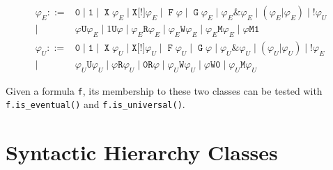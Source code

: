 \documentclass[a4paper,twoside,10pt,DIV=12]{scrreprt}
\DeclareMathOperator{\F}{\texttt{F}}
\DeclareMathOperator{\G}{\texttt{G}}
\newcommand{\U}{\mathbin{\texttt{U}}}
\newcommand{\R}{\mathbin{\texttt{R}}}
\DeclareMathOperator{\X}{\texttt{X}}
\newcommand{\StrongX}{\texttt{X[!]}}
\newcommand{\M}{\mathbin{\texttt{M}}}
\newcommand{\W}{\mathbin{\texttt{W}}}
\DeclareMathOperator{\NOT}{\texttt{!}}
\newcommand{\OR}{\mathbin{\texttt{|}}}
\newcommand{\AND}{\mathbin{\texttt{\&}}}
\newcommand{\0}{\texttt{0}}
\newcommand{\1}{\texttt{1}}
\begin{document}
\begin{align*}
  \varphi_E ::={}& \0
           \mid \1
           \mid \X \varphi_E
           \mid \StrongX \varphi_E
           \mid \F \varphi
           \mid \G \varphi_E
           \mid \varphi_E\AND \varphi_E
           \mid (\varphi_E\OR \varphi_E)
           \mid \NOT\varphi_U\\
           \mid{}&\varphi  \U \varphi_E
           \mid 1        \U \varphi
           \mid \varphi_E\R \varphi_E
           \mid \varphi_E\W \varphi_E
           \mid \varphi_E\M \varphi_E
           \mid \varphi  \M \1\\
  \varphi_U ::={}& \0
           \mid \1
           \mid \X \varphi_U
           \mid \StrongX \varphi_U
           \mid \F \varphi_U
           \mid \G \varphi
           \mid \varphi_U\AND \varphi_U
           \mid (\varphi_U\OR \varphi_U)
           \mid \NOT\varphi_E\\
           \mid{}&\varphi_U\U \varphi_U
           \mid \varphi  \R \varphi_U
           \mid \0       \R \varphi
           \mid \varphi_U\W \varphi_U
           \mid \varphi  \W \0
           \mid \varphi_U\M \varphi_U
\end{align*}

Given a formula \texttt{f}, its membership to these two classes can be
tested with \texttt{f.is\_eventual()} and \texttt{f.is\_universal()}.

\section{Syntactic Hierarchy Classes}
\end{document}
